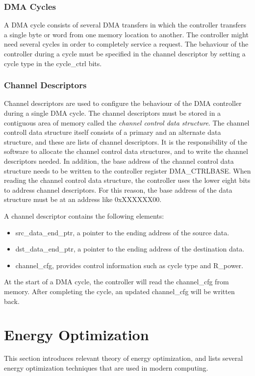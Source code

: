 \subsubsection{DMA Cycles}
A DMA cycle consists of several DMA transfers in which the controller transfers a single byte or word from one memory location to another. The controller might need several cycles in order to completely service a request. The behaviour of the controller during a cycle must be specified in the channel descriptor by setting a cycle type in the cycle\_ctrl bits.

\subsubsection{Channel Descriptors}
Channel descriptors are used to configure the behaviour of the DMA controller during a single DMA cycle. The channel descriptors must be stored in a contiguous area of memory called the \emph{channel control data structure}. The channel controll data structure itself consists of a primary and an alternate data structure, and these are lists of channel descriptors. It is the responsibility of the software to allocate the channel control data structures, and to write the channel descriptors needed. In addition, the base address of the channel control data structure needs to be written to the controller register DMA\_CTRLBASE. When reading the channel control data structure, the controller uses the lower eight bits to address channel descriptors. For this reason, the base address of the data structure must be at an address like 0xXXXXXX00.

A channel descriptor contains the following elements:
\begin{itemize}
	\item src\_data\_end\_ptr, a pointer to the ending address of the source data.
	\item dst\_data\_end\_ptr, a pointer to the ending address of the destination data.
	\item channel\_cfg, provides control information such as cycle type and R\_power.
\end{itemize}
At the start of a DMA cycle, the controller will read the channel\_cfg from memory. After completing the cycle, an updated channel\_cfg will be written back.



\section{Energy Optimization}
This section introduces relevant theory of energy optimization, and lists several energy optimization techniques that are used in modern computing.

